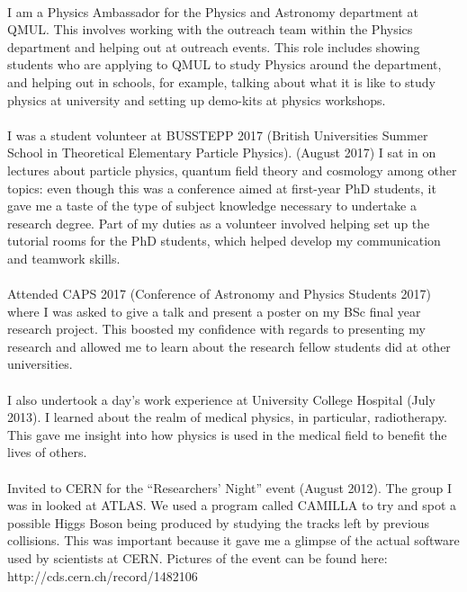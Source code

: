 \documentclass[paper=a4,fontsize=11pt]{scrartcl}	 			%
\begin{document}
\paragraph{}
I am a Physics Ambassador for the Physics and Astronomy department at QMUL. This involves working with the outreach team within the Physics department and helping out at outreach events. This role includes showing students who are applying to QMUL to study Physics around the department, and helping out in schools, for example, talking about what it is like to study physics at university and setting up demo-kits at physics workshops.
\paragraph{}
I was a student volunteer at BUSSTEPP 2017 (British Universities Summer School in Theoretical Elementary Particle Physics). (August 2017) I sat in on lectures about particle physics, quantum field theory and cosmology among other topics: even though this was a conference aimed at first-year PhD students, it gave me a taste of the type of subject knowledge necessary to undertake a research degree. Part of my duties as a volunteer involved helping set up the tutorial rooms for the PhD students, which helped develop my communication and teamwork skills.
\paragraph{}
Attended CAPS 2017 (Conference of Astronomy and Physics Students 2017) where I was asked to give a talk and present a poster on my BSc final year research project. This boosted my confidence with regards to presenting my research and allowed me to learn about the research fellow students did at other universities.
\paragraph{}
I also undertook a day's work experience at University College Hospital (July 2013). I learned about the realm of medical physics, in particular, radiotherapy. This gave me insight into how physics is used in the medical field to benefit the lives of others.
\paragraph{}
Invited to CERN for the ``Researchers' Night'' event (August 2012). The group I was in looked at ATLAS. We used a program called CAMILLA to try and spot a possible Higgs Boson being produced by studying the tracks left by previous collisions. This was important because it gave me a glimpse of the actual software used by scientists at CERN. Pictures of the event can be found here: http://cds.cern.ch/record/1482106
\end{document}
